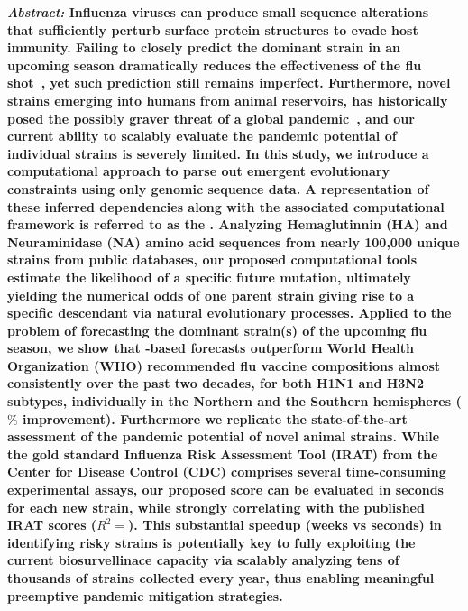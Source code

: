 \documentclass[onecolumn, compsoc,10pt]{IEEEtran}
\begin{document}
  
 
\maketitle
 
  {\bf \sffamily \fontsize{10}{12}\selectfont \noindent   
    {\normalfont \itshape Abstract:} Influenza viruses can produce  small sequence alterations~\cite{dos2016influenza}  that sufficiently perturb surface protein structures to evade host immunity. Failing to closely predict the dominant strain in an upcoming season  dramatically reduces  the  effectiveness of the flu shot~\cite{tricco2013comparing}, yet such prediction still remains imperfect. Furthermore, novel strains emerging into humans from animal reservoirs, has  historically   posed the possibly graver threat of a global  pandemic~\cite{shao2017evolution,mills2004transmissibility,reid2003origin,landolt2007up}, and our current ability to  scalably  evaluate the pandemic potential of   individual strains  is severely limited. In this study, we introduce a computational approach to  parse out emergent evolutionary constraints using only genomic sequence data. A representation of these  inferred dependencies along with the associated computational framework is referred to as the \enet.   Analyzing    Hemaglutinnin (HA) and Neuraminidase (NA) amino acid sequences from nearly 100,000 unique \infl  strains from public  databases, our proposed computational tools  estimate the likelihood of a specific future  mutation, ultimately  yielding the  numerical odds of one parent strain giving rise to a specific descendant via natural evolutionary processes. Applied  to the problem of forecasting the dominant strain(s) of the upcoming flu season, we show that \enet-based forecasts  outperform World Health Organization (WHO) recommended flu vaccine compositions almost consistently over the past two decades, for both H1N1 and H3N2 subtypes, individually in the Northern and the Southern hemispheres ($\% $ improvement). Furthermore we replicate the state-of-the-art  assessment of the pandemic potential  of novel animal  strains. While the gold standard Influenza Risk Assessment Tool (IRAT) from the Center for Disease Control (CDC) comprises several time-consuming experimental assays, our proposed \erisk score can be evaluated in seconds for each new strain, while strongly correlating with the published IRAT scores ($R^2=$). This  substantial speedup (weeks vs seconds) in  identifying risky strains is potentially key to fully exploiting the  current biosurvellinace capacity via scalably analyzing tens of thousands of strains collected every year, thus  enabling  meaningful preemptive pandemic mitigation strategies. 
}
\end{document}
